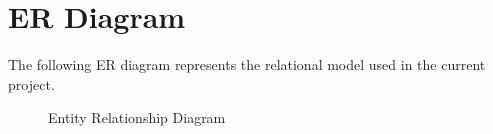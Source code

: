 \chapter{ER Diagram}

The following ER diagram represents the relational model used in the current project.

\begin{figure}[H]
\centering
\resizebox{0.95\textwidth}{!}{}
\caption{Entity Relationship Diagram}
\end{figure}
